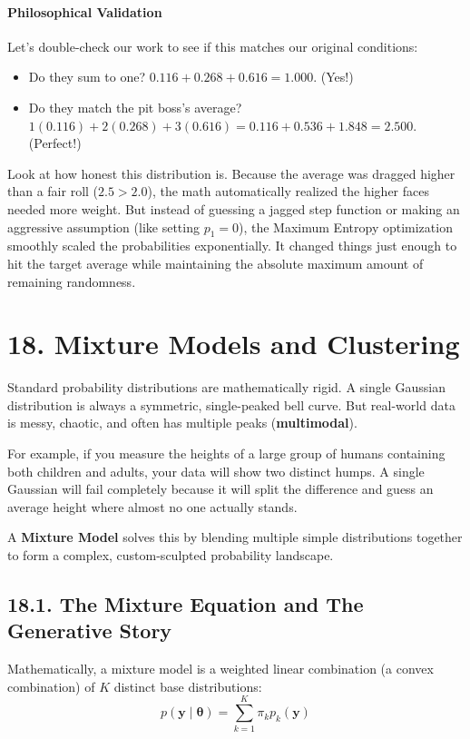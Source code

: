 \documentclass{article}
\begin{document}
\paragraph{Philosophical Validation}
Let's double-check our work to see if this matches our original conditions:
\begin{itemize}
    \item Do they sum to one? $0.116 + 0.268 + 0.616 = 1.000$. (Yes!)
    \item Do they match the pit boss's average? $1(0.116) + 2(0.268) + 3(0.616) = 0.116 + 0.536 + 1.848 = 2.500$. (Perfect!)
\end{itemize}

Look at how honest this distribution is. Because the average was dragged higher than a fair roll ($2.5 > 2.0$), the math automatically realized the higher faces needed more weight. But instead of guessing a jagged step function or making an aggressive assumption (like setting $p_1 = 0$), the Maximum Entropy optimization smoothly scaled the probabilities exponentially. It changed things just enough to hit the target average while maintaining the absolute maximum amount of remaining randomness.

\section*{18. Mixture Models and Clustering}

Standard probability distributions are mathematically rigid. A single Gaussian distribution is always a symmetric, single-peaked bell curve. But real-world data is messy, chaotic, and often has multiple peaks (\textbf{multimodal}). 

For example, if you measure the heights of a large group of humans containing both children and adults, your data will show two distinct humps. A single Gaussian will fail completely because it will split the difference and guess an average height where almost no one actually stands.

A \textbf{Mixture Model} solves this by blending multiple simple distributions together to form a complex, custom-sculpted probability landscape.

\subsection*{18.1. The Mixture Equation and The Generative Story}
Mathematically, a mixture model is a weighted linear combination (a convex combination) of $K$ distinct base distributions:
\begin{equation}
p(\mathbf{y} \mid \boldsymbol{\theta}) = \sum_{k=1}^K \pi_k p_k(\mathbf{y}) \tag{113}
\end{equation}
\end{document}
